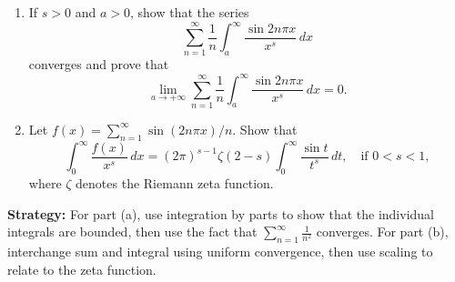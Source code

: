 \begin{problembox}
\begin{enumerate}[label=(\alph*)]
\item If $s > 0$ and $a > 0$, show that the series
\[\sum_{n=1}^{\infty} \frac{1}{n} \int_{a}^{\infty} \frac{\sin 2n\pi x}{x^{s}} \, dx\]
converges and prove that
\[\lim_{a \to +\infty} \sum_{n=1}^{\infty} \frac{1}{n} \int_{a}^{\infty} \frac{\sin 2n\pi x}{x^{s}} \, dx = 0.\]
\item Let $f(x) = \sum_{n=1}^{\infty} \sin (2n\pi x)/n$. Show that
\[\int_{0}^{\infty} \frac{f(x)}{x^{s}} \, dx = (2\pi)^{s-1} \zeta (2 - s) \int_{0}^{\infty} \frac{\sin t}{t^{s}} \, dt, \quad \text{if } 0 < s < 1,\]
where $\zeta$ denotes the Riemann zeta function.
\end{enumerate}
\end{problembox}

\noindent\textbf{Strategy:} For part (a), use integration by parts to show that the individual integrals are bounded, then use the fact that $\sum_{n=1}^{\infty} \frac{1}{n^2}$ converges. For part (b), interchange sum and integral using uniform convergence, then use scaling to relate to the zeta function.

